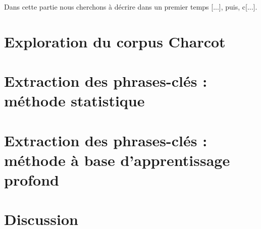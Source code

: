 \label{resultats}

Dans cette partie nous cherchons à décrire dans un premier temps [...], puis, c[...].

\section{Exploration du corpus Charcot}
\section{Extraction des phrases-clés : méthode statistique}
\section{Extraction des phrases-clés : méthode à base d'apprentissage profond}
\section{Discussion}
